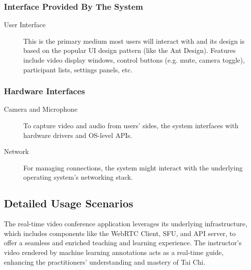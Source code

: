 \documentclass[12pt]{article}
\begin{document}
\subsubsection{Interface Provided By The System}
\begin{description}
    \item[User Interface] This is the primary medium most users will interact with and its design is based on the popular UI design pattern (like the Ant Design). Features include video display windows, control buttons (e.g. mute, camera toggle), participant lists, settings panels, etc.
\end{description}
\subsubsection{Hardware Interfaces}
\begin{description}
    \item[Camera and Microphone] To capture video and audio from users’ sides, the system interfaces with hardware drivers and OS-level APIs.
    \item[Network] For managing connections, the system might interact with the underlying operating system’s networking stack.
\end{description}
\subsection{Detailed Usage Scenarios}
The real-time video conference application leverages its underlying infrastructure, which includes components like the WebRTC Client, SFU, and API server, to offer a seamless and enriched teaching and learning experience. The instructor's video rendered by machine learning annotations acts as a real-time guide, enhancing the practitioners' understanding and mastery of Tai Chi.
\end{document}
